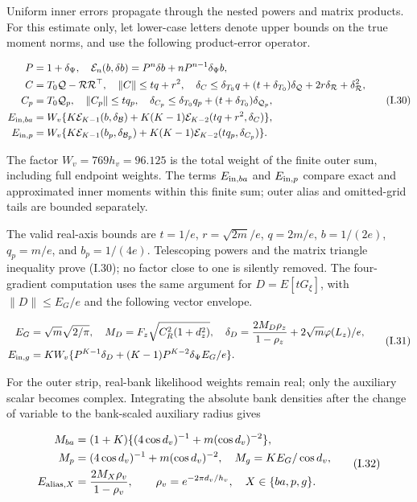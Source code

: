 \documentclass{article}
\begin{document}
Uniform inner errors propagate through the nested powers and matrix
products. For this estimate only, let lower-case letters denote upper
bounds on the true moment norms, and use the following product-error
operator.

\[
\begin{aligned}
P&=1+\delta_\Psi,\quad
\mathcal E_n(b,\delta b)=P^n\delta b+nP^{n-1}\delta_\Psi b,\\
C&=T_0\mathcal Q-\mathcal R\mathcal R^\top,\quad
\|C\|\le tq+r^2,\quad
\delta_C\le\delta_{T_0}q+(t+\delta_{T_0})\delta_{\mathcal Q}+2r\delta_{\mathcal R}+\delta_{\mathcal R}^2,\\
C_p&=T_0\mathcal Q_p,\quad\|C_p\|\le tq_p,\quad
\delta_{C_p}\le\delta_{T_0}q_p+(t+\delta_{T_0})\delta_{\mathcal Q_p},\\
E_{{\rm in},ba}&=W_v\{K\mathcal E_{K-1}(b,\delta_{\mathcal B})
+K(K-1)\mathcal E_{K-2}(tq+r^2,\delta_C)\},\\
E_{{\rm in},p}&=W_v\{K\mathcal E_{K-1}(b_p,\delta_{\mathcal B_p})
+K(K-1)\mathcal E_{K-2}(tq_p,\delta_{C_p})\}.
\end{aligned}
\tag{I.30}
\]

The factor \(W_v=769h_v=96.125\) is the total weight of the finite outer
sum, including full endpoint weights. The terms \(E_{{\rm in},ba}\) and
\(E_{{\rm in},p}\) compare exact and approximated inner moments within
this finite sum; outer alias and omitted-grid tails are bounded
separately.

The valid real-axis bounds are \(t=1/e\), \(r=\sqrt{2m}/e\), \(q=2m/e\),
\(b=1/(2e)\), \(q_p=m/e\), and \(b_p=1/(4e)\). Telescoping powers and
the matrix triangle inequality prove (I.30); no factor close to one is
silently removed. The four-gradient computation uses the same argument
for \(D=E[tG_\xi]\), with \(\|D\|\le E_G/e\) and the following vector
envelope.

\[
\begin{aligned}
E_G&=\sqrt m\sqrt{2/\pi},\quad
M_D=F_z\sqrt{C_R^2(1+d_z^2)},\quad
\delta_D=\frac{2M_D\rho_z}{1-\rho_z}+2\sqrt m\varphi(L_z)/e,\\
E_{{\rm in},g}&=KW_v\{P^{K-1}\delta_D+(K-1)P^{K-2}\delta_\Psi E_G/e\}.
\end{aligned}
\tag{I.31}
\]

For the outer strip, real-bank likelihood weights remain real; only the
auxiliary scalar becomes complex. Integrating the absolute bank
densities after the change of variable to the bank-scaled auxiliary
radius gives

\[
\begin{aligned}
M_{ba}&=(1+K)\{(4\cos d_v)^{-1}+m(\cos d_v)^{-2}\},\\
M_p&=(4\cos d_v)^{-1}+m(\cos d_v)^{-2},\quad M_g=KE_G/\cos d_v,\\
E_{{\rm alias},X}&=\frac{2M_X\rho_v}{1-\rho_v},\qquad
\rho_v=e^{-2\pi d_v/h_v},\quad X\in\{ba,p,g\}.
\end{aligned}
\tag{I.32}
\]
\end{document}
